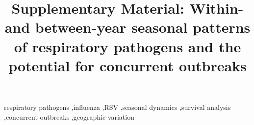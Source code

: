 \documentclass[preprint,12pt]{elsarticle}
\begin{document}
\begin{frontmatter}

\title{Supplementary Material: Within- and between-year seasonal patterns of respiratory pathogens and the potential for concurrent outbreaks}

%
%
%

\begin{keyword}
respiratory pathogens \sep influenza \sep RSV \sep seasonal dynamics \sep survival analysis \sep concurrent outbreaks \sep geographic variation
\end{keyword}

\end{frontmatter}






\end{document}
